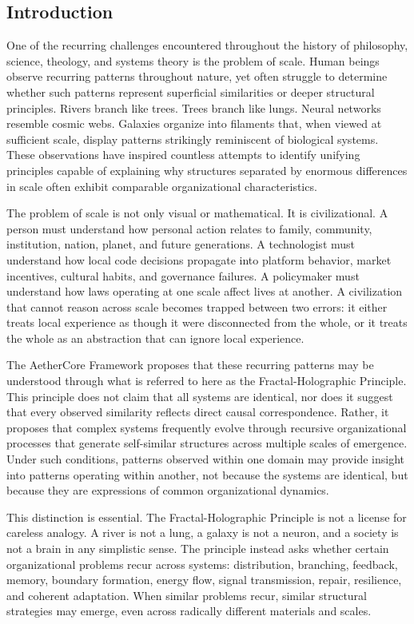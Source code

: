 \documentclass[12pt]{article}
\begin{document}
\subsection{Introduction}

One of the recurring challenges encountered throughout the history of philosophy, science, theology, and systems theory is the problem of scale. Human beings observe recurring patterns throughout nature, yet often struggle to determine whether such patterns represent superficial similarities or deeper structural principles. Rivers branch like trees. Trees branch like lungs. Neural networks resemble cosmic webs. Galaxies organize into filaments that, when viewed at sufficient scale, display patterns strikingly reminiscent of biological systems. These observations have inspired countless attempts to identify unifying principles capable of explaining why structures separated by enormous differences in scale often exhibit comparable organizational characteristics.

The problem of scale is not only visual or mathematical. It is civilizational. A person must understand how personal action relates to family, community, institution, nation, planet, and future generations. A technologist must understand how local code decisions propagate into platform behavior, market incentives, cultural habits, and governance failures. A policymaker must understand how laws operating at one scale affect lives at another. A civilization that cannot reason across scale becomes trapped between two errors: it either treats local experience as though it were disconnected from the whole, or it treats the whole as an abstraction that can ignore local experience.

The AetherCore Framework proposes that these recurring patterns may be understood through what is referred to here as the Fractal-Holographic Principle. This principle does not claim that all systems are identical, nor does it suggest that every observed similarity reflects direct causal correspondence. Rather, it proposes that complex systems frequently evolve through recursive organizational processes that generate self-similar structures across multiple scales of emergence. Under such conditions, patterns observed within one domain may provide insight into patterns operating within another, not because the systems are identical, but because they are expressions of common organizational dynamics.

This distinction is essential. The Fractal-Holographic Principle is not a license for careless analogy. A river is not a lung, a galaxy is not a neuron, and a society is not a brain in any simplistic sense. The principle instead asks whether certain organizational problems recur across systems: distribution, branching, feedback, memory, boundary formation, energy flow, signal transmission, repair, resilience, and coherent adaptation. When similar problems recur, similar structural strategies may emerge, even across radically different materials and scales.
\end{document}
